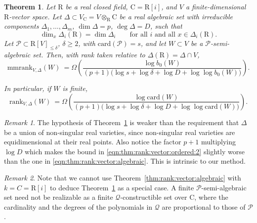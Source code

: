 \documentclass[10pt]{amsart}
\newtheorem{theorem}{Theorem}
\theoremstyle{definition}
\theoremstyle{remark}
\newtheorem{remark}{Remark}
\numberwithin{equation}{section}
\newcommand {\R} {\mathrm{R}}
\newcommand {\C}     {\mathrm{C}}
\newcommand{\card}{\mathrm{card}}
\newcommand{\rank}{\mathrm{rank}}
\newcommand{\mmrank}{\mathrm{mmrank}}
\begin{document}
\begin{theorem}
\label{thm:rank:vector:ordered}
Let $\R$ be a real closed field, $\C=\R[i]$, and $V$ a finite-dimensional $\R$-vector space. Let $\Delta\subset V_\C=V\otimes_\R \C$ be a real algebraic set with irreducible components $\Delta_1,\dots,\Delta_m$, $\dim\Delta=p$, $\deg\Delta=D$, such that
\[
\dim_x\Delta_i(\R)=\dim\Delta_i\qquad\text{for all $i$ and all }x\in\Delta_i(\R).
\]
Let $\mathcal{P}\subset\R[V]_{\le\delta}$, $\delta \geq 2$, 
with $\card(\mathcal{P})=s$, and let $W\subset V$ be a $\mathcal{P}$-semi-algebraic set. Then, with rank taken relative to $\Delta(\R)=\Delta\cap V$,
\begin{equation}
\label{eqn:thm:rank:vector:ordered:1}
\mmrank_{V,\Delta}(W)\ = \Omega\left( \frac{\log b_0(W)}{(p+1)\bigl(\log s+\log\delta+\log D+\log\log b_0(W)\bigr)}\right).
\end{equation}

In particular, if $W$ is finite,
\begin{equation}
\label{eqn:thm:rank:vector:ordered:2}
\rank_{V,\Delta}(W)\ = \Omega\left(\frac{\log\card(W)}{(p+1)\bigl(\log s+\log\delta+\log D+\log\log\card(W)\bigr)}\right).
\end{equation}
\end{theorem}
 
\begin{remark}
\label{rem:thm:rank:vector:ordered:1}
The hypothesis of Theorem~\ref{thm:rank:vector:ordered} is weaker than the requirement that $\Delta$ be a union of non-singular real varieties, since non-singular real varieties are equidimensional at their real points. 
Also notice the factor $p+1$ multiplying $\log D$ 
which makes the bound in \eqref{eqn:thm:rank:vector:ordered:2} slightly worse than the one in \eqref{eqn:thm:rank:vector:algebraic}. This is 
intrinsic to our method.
\end{remark}

\begin{remark}
\label{rem:thm:rank:vector:ordered:2}
Note that we cannot use 
Theorem~\ref{thm:rank:vector:algebraic} with $k = C = \R[i]$
to deduce Theorem~\ref{thm:rank:vector:ordered} as a special case.
A finite $\mathcal{P}$-semi-algebraic set need not be realizable
as a finite $\mathcal{Q}$-constructible set over $\C$, where
the cardinality and the degrees of the polynomials in $\mathcal{Q}$ are 
proportional to those of $\mathcal{P}$.
\end{remark}
\end{document}
